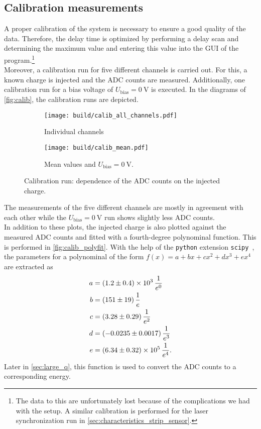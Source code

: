 \subsection{Calibration measurements}
\label{sec:analysis_calib}
A proper calibration of the system is necessary to ensure a good quality of the data. Therefore, the delay time is optimized by performing a delay scan and determining
the maximum value and entering this value into the GUI of the program.\footnote{The data to this are unfortunately lost because of the complications we had with the setup.
A similar calibration is performed for the laser synchronization run in \autoref{sec:characteristics_strip_sensor}.}\\
Moreover, a calibration run for five different channels is carried out. For this, a known charge is injected and the ADC counts are measured. Additionally, one
calibration run for a bias voltage of $U_{\mathrm{bias}}=\qty{0}{\volt}$ is executed. In the diagrams of \autoref{fig:calib}, the calibration runs are depicted.

\begin{figure}
    \centering
    \begin{subfigure}{0.6\textwidth}
        \texttt{[image: build/calib\_all\_channels.pdf]}
        \caption{Individual channels}
        \label{fig:calib_all_channels}
    \end{subfigure}
    \hfill
    \begin{subfigure}{0.6\textwidth}
        \texttt{[image: build/calib\_mean.pdf]}
        \caption{Mean values and $U_{\mathrm{bias}}=\qty{0}{\volt}$.}
        \label{fig:calib_mean}
    \end{subfigure}
    \caption{Calibration run: dependence of the ADC counts on the injected charge.}
    \label{fig:calib}
\end{figure}

The measurements of the five different channels are mostly in agreement with each other while the $U_{\mathrm{bias}}=\qty{0}{\volt}$ run shows slightly
less ADC counts. \\
In addition to these plots, the injected charge is also plotted against the measured ADC counts and fitted with a fourth-degree polynominal 
function. This is performed in \autoref{fig:calib_polyfit}. With the help of the \texttt{python} extension \texttt{scipy}~\cite{scipy}, the parameters for
a polynominal of the form $f(x) = a + bx + cx^2 + dx^3 + ex^4$ are extracted as
\begin{align*}
    a &= \qty{1.2(0.4)e3}{\per\raiseto{0}\elementarycharge} \\
    b &= \qty{151+-19}{\per\raiseto{1}\elementarycharge} \\
    c &= \qty{3.28+-0.29}{\per\raiseto{2}\elementarycharge} \\
    d &= \qty{-0.0235+-0.0017}{\per\raiseto{3}\elementarycharge} \\
    e &= \qty{6.34(0.32)e5}{\per\raiseto{4}\elementarycharge}. \\
\end{align*} 
Later in \autoref{sec:large_q}, this function is used to convert the ADC counts to a corresponding energy.

